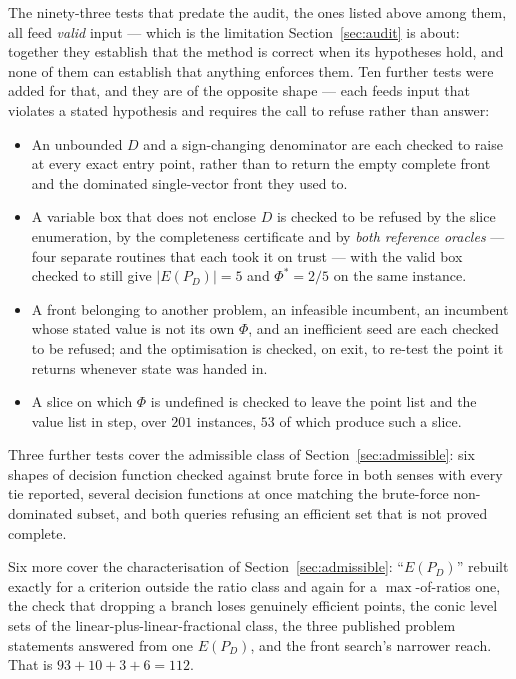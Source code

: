 \documentclass[11pt,a4paper]{article}
\newcommand{\Dset}{D}
\newcommand{\E}{E(P_{\Dset})}
\begin{document}
\noindent
The ninety-three tests that predate the audit, the ones listed above among
them, all feed \emph{valid} input --- which is the limitation
Section~\ref{sec:audit} is about: together they establish that the method is
correct when its hypotheses hold, and none of them can establish that anything
enforces them. Ten further tests were added for that, and they are of the
opposite shape --- each feeds input that violates a stated hypothesis and
requires the call to refuse rather than answer:

\begin{itemize}
\itemsep2pt
\item An unbounded $\Dset$ and a sign-changing denominator are each checked to
      raise at every exact entry point, rather than to return the empty
      complete front and the dominated single-vector front they used to.
\item A variable box that does not enclose $\Dset$ is checked to be refused by
      the slice enumeration, by the completeness certificate and by \emph{both
      reference oracles} --- four separate routines that each took it on trust
      --- with the valid box checked to still give $|\E| = 5$ and
      $\Phi^{*} = 2/5$ on the same instance.
\item A front belonging to another problem, an infeasible incumbent, an
      incumbent whose stated value is not its own $\Phi$, and an inefficient
      seed are each checked to be refused; and the optimisation is checked, on
      exit, to re-test the point it returns whenever state was handed in.
\item A slice on which $\Phi$ is undefined is checked to leave the point list
      and the value list in step, over $201$ instances, $53$ of which produce
      such a slice.
\end{itemize}

\noindent
Three further tests cover the admissible class of Section~\ref{sec:admissible}:
six shapes of decision function checked against brute force in both senses with
every tie reported, several decision functions at once matching the brute-force
non-dominated subset, and both queries refusing an efficient set that is not
proved complete.

Six more cover the characterisation of
Section~\ref{sec:admissible}: ``$E(P_D)$'' rebuilt exactly for a criterion
outside the ratio class and again for a $\max$-of-ratios one, the check that
dropping a branch loses genuinely efficient points, the conic level sets of the
linear-plus-linear-fractional class, the three published problem statements
answered from one $\E$, and the front search's narrower reach.  That is
$93 + 10 + 3 + 6 = 112$.
\end{document}
